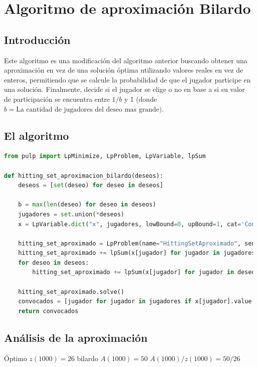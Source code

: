 \documentclass{estilo}
\begin{document}
\newpage

\section{Algoritmo de aproximación Bilardo}

\subsection{Introducción}

Este algoritmo es una modificación del algoritmo anterior buscando obtener una aproximación en vez de una solución óptima utilizando valores reales en vez de enteros, permitiendo que se calcule la probabilidad de que el jugador participe en una solución. Finalmente, decide si el jugador se elige o no en base a si su valor de participación se encuentra entre $1/b$  y 1 (donde $b = \text{La cantidad de jugadores del deseo mas grande)}$.

\subsection{El algoritmo}

\begin{lstlisting}[language=Python]
from pulp import LpMinimize, LpProblem, LpVariable, lpSum

def hitting_set_aproximacion_bilardo(deseos):
    deseos = [set(deseo) for deseo in deseos]
    
    b = max(len(deseo) for deseo in deseos)
    jugadores = set.union(*deseos)
    x = LpVariable.dict("x", jugadores, lowBound=0, upBound=1, cat='Continuous')
    
    hitting_set_aproximado = LpProblem(name="HittingSetAproximado", sense=LpMinimize)
    hitting_set_aproximado += lpSum(x[jugador] for jugador in jugadores)
    for deseo in deseos:
        hitting_set_aproximado += lpSum(x[jugador] for jugador in deseo) >= 1
        
    hitting_set_aproximado.solve()
    convocados = [jugador for jugador in jugadores if x[jugador].value() >= 1/b]
    return convocados
\end{lstlisting}

\subsection{Análisis de la aproximación}

Óptimo $z(1000) = 26$ bilardo $A(1000) = 50$
$A(1000)/z(1000) = 50/26 $
\end{document}
